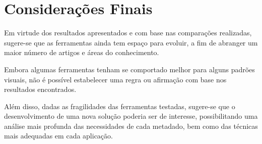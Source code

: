 \section{Considerações Finais}
\label{sec:final-considerations}

Em virtude dos resultados apresentados e com base nas comparações realizadas, sugere-se que as ferramentas ainda tem espaço para evoluir, a fim de abranger um maior número de artigos e áreas do conhecimento.
 
Embora algumas ferramentas tenham se comportado melhor para alguns padrões visuais, não é possível estabelecer uma regra ou afirmação com base nos resultados encontrados.

Além disso, dadas as fragilidades das ferramentas testadas, sugere-se que o desenvolvimento de uma nova solução poderia ser de interesse, possibilitando uma análise mais profunda das necessidades de cada metadado, bem como das técnicas mais adequadas em cada aplicação.

